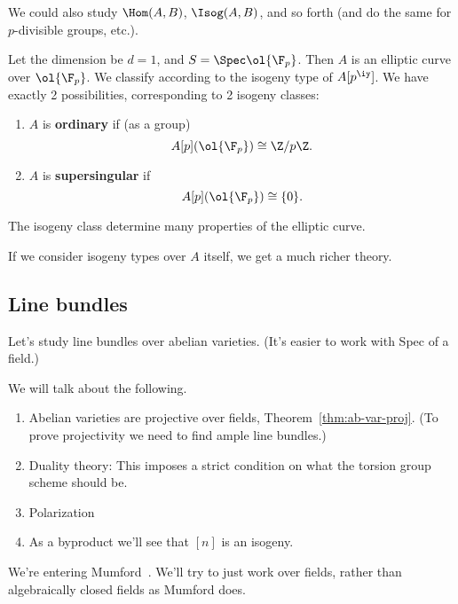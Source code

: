 We could also study $\Hom(A,B)$, $\Isog(A,B)$, and so forth (and do the same for $p$-divisible groups, etc.).
\begin{ex}
Let the dimension be $d=1$, and $S=\Spec \ol{\F_p}$. Then $A$ is an elliptic curve over $\ol{\F_p}$. We classify according to the isogeny type of $A[p^{\iy}]$. We have exactly 2 possibilities, corresponding to 2 isogeny classes:
\begin{enumerate}
\item
$A$ is \textbf{ordinary} if  (as a group)
\[
A[p](\ol{\F_p})\cong \Z/p\Z.
\]
\item
$A$ is \textbf{supersingular} if
\[
A[p](\ol{\F_p})\cong \{0\}.
\]
\end{enumerate}
The isogeny class determine many properties of the elliptic curve.

If we consider isogeny types over $A$ itself, we get a much richer theory. %
\end{ex}
\subsection{Line bundles}
Let's study line bundles over abelian varieties. (It's easier to work with Spec of a field.)

We will talk about the following.
\begin{enumerate}
\item
Abelian varieties are projective over fields, Theorem~\ref{thm:ab-var-proj}. (To prove projectivity we need to find ample line bundles.) 
\item Duality theory: This imposes a strict condition on what the torsion group scheme should be.
\item Polarization
\item As a byproduct we'll see that $[n]$ is an isogeny.
\end{enumerate}

We're entering Mumford~\cite[\S 6]{Mu70}. We'll try to just work over fields, rather than algebraically closed fields as Mumford does.

